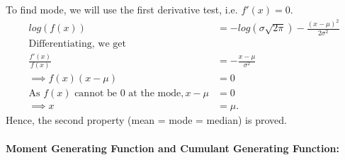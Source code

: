 \documentclass[
10pt, %
a4paper, %
]{report}
\begin{document}
To find mode, we will use the first derivative test, i.e. \(f'(x) = 0\).
\begin{align*}
    log(f(x)) &= -log(\sigma\sqrt{2\pi}) - \frac{(x-\mu)^2}{2\sigma^2} \\
    \text{Differentiating, we get} \\
    \frac{f'(x)}{f(x)} &= -\frac{x-\mu}{\sigma^2} \\
    \implies f(x) (x-\mu) &= 0 \\
    \text{As \(f(x)\) cannot be 0 at the mode}, x-\mu &= 0 \\
    \implies x &= \mu.
\end{align*}
Hence, the second property (mean = mode = median) is proved.

\paragraph*{Moment Generating Function and Cumulant Generating Function:}
\end{document}
